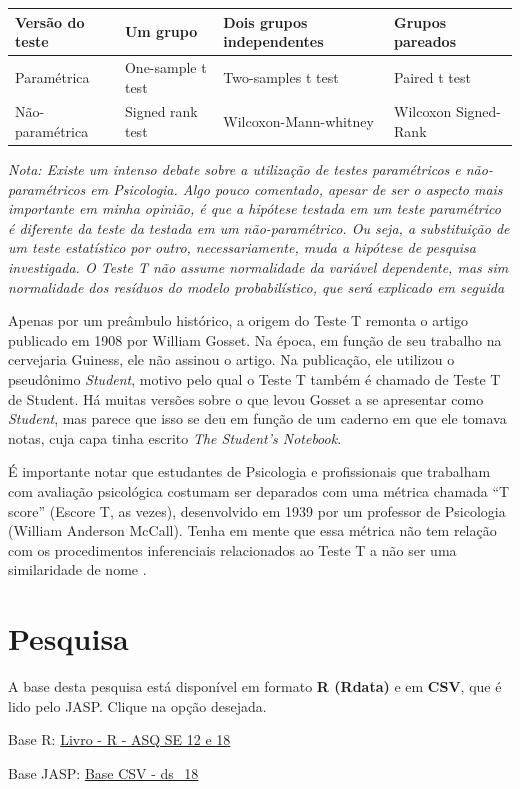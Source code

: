 \documentclass[
]{book}
\newenvironment{base}{
  \definecolor{shadecolor}{rgb}{0.972,0.972,0.972}  %
  \color{black}
  \begin{shaded}}
 {\end{shaded}}
\begin{document}
\begin{longtable}[]{@{}llll@{}}
\toprule
Versão do teste & Um grupo & Dois grupos independentes & Grupos pareados\tabularnewline
\midrule
\endhead
Paramétrica & One-sample t test & Two-samples t test & Paired t test\tabularnewline
Não-paramétrica & Signed rank test & Wilcoxon-Mann-whitney & Wilcoxon Signed-Rank\tabularnewline
\bottomrule
\end{longtable}

\emph{Nota: Existe um intenso debate sobre a utilização de testes paramétricos e não-paramétricos em Psicologia. Algo pouco comentado, apesar de ser o aspecto mais importante em minha opinião, é que a hipótese testada em um teste paramétrico é diferente da teste da testada em um não-paramétrico. Ou seja, a substituição de um teste estatístico por outro, necessariamente, muda a hipótese de pesquisa investigada. O Teste T não assume normalidade da variável dependente, mas sim normalidade dos resíduos do modelo probabilístico, que será explicado em seguida}

Apenas por um preâmbulo histórico, a origem do Teste T remonta o artigo publicado em 1908 por William Gosset. Na época, em função de seu trabalho na cervejaria Guiness, ele não assinou o artigo. Na publicação, ele utilizou o pseudônimo \emph{Student}, motivo pelo qual o Teste T também é chamado de Teste T de Student. Há muitas versões sobre o que levou Gosset a se apresentar como \emph{Student}, mas parece que isso se deu em função de um caderno em que ele tomava notas, cuja capa tinha escrito \emph{The Student's Notebook}.

É importante notar que estudantes de Psicologia e profissionais que trabalham com avaliação psicológica costumam ser deparados com uma métrica chamada ``T score'' (Escore T, as vezes), desenvolvido em 1939 por um professor de Psicologia (William Anderson McCall). Tenha em mente que essa métrica não tem relação com os procedimentos inferenciais relacionados ao Teste T a não ser uma similaridade de nome \citep{Krus1977}.

\hypertarget{pesquisa-3}{%
\section{Pesquisa}\label{pesquisa-3}}

\begin{base}
A base desta pesquisa está disponível em formato \textbf{R (Rdata)} e em \textbf{CSV}, que é lido pelo JASP. Clique na opção desejada.

Base R: \href{https://github.com/anovabr/mqt/raw/master/bases/Livro\%20-\%20R\%20-\%20ASQ\%20SE\%2012\%20e\%2018.RData}{Livro - R - ASQ SE 12 e 18}

Base JASP: \href{https://github.com/anovabr/mqt/raw/master/bases/bases_csv_jasp.zip}{Base CSV - ds\_18}

\end{base}
\end{document}
